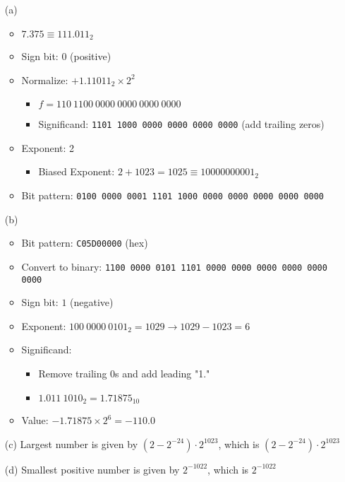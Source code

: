 \documentclass{article}
\begin{document}
\begin{enumerate}
    \item[(a)] \begin{itemize}
            \item $7.375 \equiv 111.011_2$
            \item Sign bit: $0$ (positive)
            \item Normalize: $+1.11011_2 \times 2^2$
                  \begin{itemize}
                      \item $f=110\ 1100\ 0000\ 0000\ 0000\ 0000$
                      \item Significand: \texttt{1101 1000 0000 0000 0000 0000} (add trailing zeros)
                  \end{itemize}
            \item Exponent: 2
                  \begin{itemize}
                      \item Biased Exponent: $2+1023=1025 \equiv 10000000001_2$
                  \end{itemize}
            \item Bit pattern: \texttt{0100 0000 0001 1101 1000 0000 0000 0000 0000 0000}
        \end{itemize}
    \item[(b)]
        \begin{itemize}
            \item Bit pattern: \texttt{C05D00000} (hex)
            \item Convert to binary: \texttt{1100 0000 0101 1101 0000 0000 0000 0000 0000 0000}
            \item Sign bit: $1$ (negative)
            \item Exponent: $100\ 0000\ 0101_2 = 1029 \rightarrow 1029 - 1023 = 6$
            \item Significand:
                  \begin{itemize}
                      \item Remove trailing 0s and add leading "1."
                      \item $1.011\ 1010_2 = 1.71875_{10}$
                  \end{itemize}
            \item Value: $-1.71875 \times 2^6 = -110.0$
        \end{itemize}
    \item[(c)] Largest number is given by $(2-2^{-24}) \cdot 2^{1023}$, which is $(2-2^{-24}) \cdot 2^{1023}$
    \item[(d)] Smallest positive number is given by $2^{-1022}$, which is $2^{-1022}$
\end{enumerate}
\end{document}

